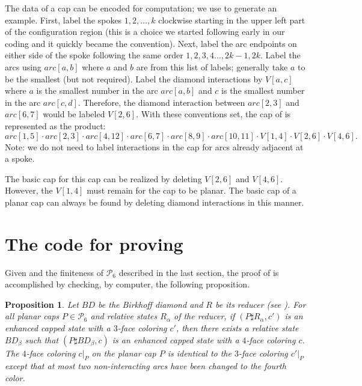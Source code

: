\documentclass[12pt]{amsart}
\newtheorem{proposition}[theorem]{Proposition}
\theoremstyle{definition}
\theoremstyle{remark}
\numberwithin{equation}{section}
\begin{document}
The data of a cap can be encoded for computation; we use  to generate an example. First, label the spokes $1,2,\dots,k$ clockwise starting in the upper left part of the configuration region (this is  a choice we started following early in our coding and it quickly became the convention).  Next, label the arc endpoints on either side of the spoke following the same order $1,2,3,4\dots, 2k-1, 2k$. Label the arcs using $arc[a,b]$ where $a$ and $b$ are from this list of labels; generally take $a$ to be the smallest (but not required). Label the diamond interactions by $V[a,c]$ where $a$ is the smallest number in the arc $arc[a,b]$ and $c$ is the smallest number in the arc $arc[c,d]$. Therefore, the diamond interaction between $arc[2,3]$ and $arc[6,7]$ would be labeled $V[2,6]$. With these conventions set, the cap of   is represented as the product:
\begin{equation}\label{equation:cap-data}
arc[1,5] \cdot arc[2,3] \cdot arc[4,12] \cdot arc[6,7] \cdot arc[8,9] \cdot arc[10,11] \cdot V[1,4] \cdot V[2,6] \cdot V[4,6].
\end{equation}
Note:  we do not need to label interactions in the cap for arcs already adjacent at a spoke.

The basic cap for this cap can be realized by deleting $V[2,6]$ and $V[4,6]$. However, the $V[1,4]$ must remain for the cap to be planar. The basic cap of a planar cap can always be found by deleting diamond interactions in this manner. 

 \section{The code for proving } 
\label{section:main-computation}

Given  and the finiteness of $\mathcal{P}_6$ described in the last section, the proof of  is accomplished by checking, by computer, the following proposition.

\begin{proposition}\label{proposition:3-face-to-4-face-Birkhoff}
Let $BD$ be the Birkhoff diamond  and $R$ be its reducer  (see ). For all planar caps $P\in \mathcal{P}_6$ and relative states $R_\alpha$ of the reducer, if $(P\sharp R_\alpha, c')$ is an enhanced capped state with a $3$-face coloring $c'$, then there exists a relative state $BD_\beta$ such that $(P\sharp BD_\beta, c)$ is an enhanced capped state with a $4$-face coloring $c$. The $4$-face coloring $c|_P$ on the planar cap $P$ is identical to the $3$-face coloring $c'|_P$ except that at most two non-interacting arcs have been changed to the fourth color.
\end{proposition}
\end{document}
